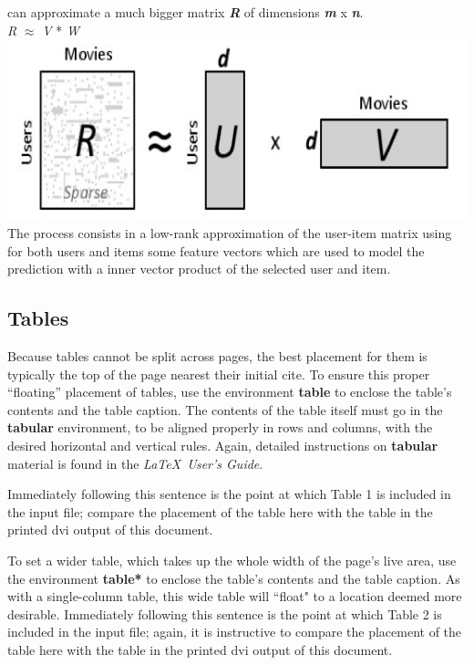 \documentclass{sig-alternate-05-2015}
\begin{document}
can approximate a much bigger matrix {\large{\textit{\textbf{R}}} of dimensions \textit{\textbf{m}} x \textit{\textbf{n}}.\\
    \textit{R} \(\approx\) \textit{V} * \textit{W}
}\\
\includegraphics[scale=0.45]{matrix_factorization.png}
The process consists in a low-rank approximation of the user-item matrix using
for both users and items some feature vectors which are used to model
the prediction with a inner vector product of the selected user and item.


\subsection{Tables}
Because tables cannot be split across pages, the best
placement for them is typically the top of the page
nearest their initial cite.  To
ensure this proper ``floating'' placement of tables, use the
environment \textbf{table} to enclose the table's contents and
the table caption.  The contents of the table itself must go
in the \textbf{tabular} environment, to
be aligned properly in rows and columns, with the desired
horizontal and vertical rules.  Again, detailed instructions
on \textbf{tabular} material
is found in the \textit{\LaTeX\ User's Guide}.

Immediately following this sentence is the point at which
Table 1 is included in the input file; compare the
placement of the table here with the table in the printed
dvi output of this document.



To set a wider table, which takes up the whole width of
the page's live area, use the environment
\textbf{table*} to enclose the table's contents and
the table caption.  As with a single-column table, this wide
table will ``float" to a location deemed more desirable.
Immediately following this sentence is the point at which
Table 2 is included in the input file; again, it is
instructive to compare the placement of the
table here with the table in the printed dvi
output of this document.
\end{document}
